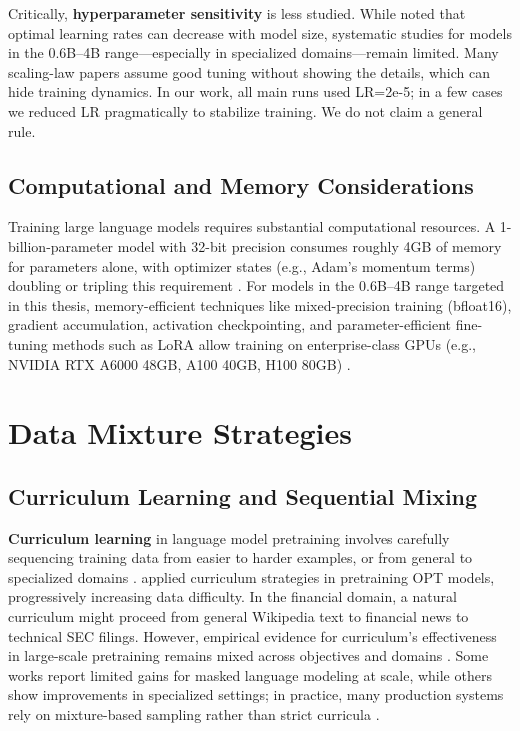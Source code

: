 Critically, \textbf{hyperparameter sensitivity} is less studied. While \textcite{mccandlish2018empirical} noted that optimal learning rates can decrease with model size, systematic studies for models in the 0.6B–4B range—especially in specialized domains—remain limited. Many scaling-law papers assume good tuning without showing the details, which can hide training dynamics. In our work, all main runs used LR=2e-5; in a few cases we reduced LR pragmatically to stabilize training. We do not claim a general rule.

\subsection{Computational and Memory Considerations}

Training large language models requires substantial computational resources. A 1-billion-parameter model with 32-bit precision consumes roughly 4GB of memory for parameters alone, with optimizer states (e.g., Adam's momentum terms) doubling or tripling this requirement \parencite{rajbhandari2020zero,kingma2014adam}. For models in the 0.6B–4B range targeted in this thesis, memory-efficient techniques like mixed-precision training (bfloat16), gradient accumulation, activation checkpointing, and parameter-efficient fine-tuning methods such as LoRA allow training on enterprise-class GPUs (e.g., NVIDIA RTX A6000 48GB, A100 40GB, H100 80GB) \parencite{narayanan2021efficient,hu2021lora}.

\section{Data Mixture Strategies}

\subsection{Curriculum Learning and Sequential Mixing}

\textbf{Curriculum learning} in language model pretraining involves carefully sequencing training data from easier to harder examples, or from general to specialized domains \parencite{bengio2009curriculum}. \textcite{wu2022opt} applied curriculum strategies in pretraining OPT models, progressively increasing data difficulty. In the financial domain, a natural curriculum might proceed from general Wikipedia text to financial news to technical SEC filings. However, empirical evidence for curriculum's effectiveness in large-scale pretraining remains mixed across objectives and domains \parencite{longpre2023pretrainer}. Some works report limited gains for masked language modeling at scale, while others show improvements in specialized settings; in practice, many production systems rely on mixture-based sampling rather than strict curricula \parencite{raffel2020exploring,wu2022opt}.

